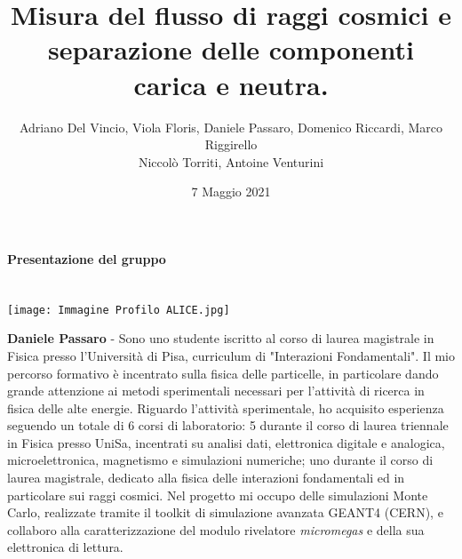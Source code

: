 \documentclass{article}
\title{\textbf{Misura del flusso di raggi cosmici e separazione delle componenti carica e neutra.}}
\author{Adriano Del Vincio, Viola Floris, Daniele Passaro, Domenico Riccardi, Marco Riggirello
\\
Niccolò Torriti, Antoine Venturini}
\date{7 Maggio 2021}
\begin{document}
\maketitle
\begin{center}
\textbf{\Large Presentazione del gruppo}
\end{center}

\section*{}

\begin{minipage}{0.2\textwidth}
\texttt{[image: Immagine Profilo ALICE.jpg]}
\end{minipage}
\hfill
\begin{minipage}{0.75\textwidth}
\textbf{Daniele Passaro} - Sono uno studente iscritto al corso di laurea magistrale in Fisica presso l'Università di Pisa, curriculum di  "Interazioni Fondamentali". 
Il mio percorso formativo è incentrato sulla fisica delle particelle, in particolare dando grande attenzione ai metodi sperimentali necessari per l'attività di ricerca in fisica delle alte energie. Riguardo l'attività sperimentale, ho acquisito esperienza seguendo un totale di 6 corsi di laboratorio: 5 durante il corso di laurea triennale in Fisica presso UniSa, incentrati su analisi dati, elettronica digitale e analogica, microelettronica, magnetismo e simulazioni numeriche; uno durante il corso di laurea magistrale, dedicato alla fisica delle interazioni fondamentali ed in particolare sui raggi cosmici.
Nel progetto mi occupo delle simulazioni Monte Carlo, realizzate tramite il toolkit di simulazione avanzata GEANT4 (\textcopyright CERN), e collaboro alla caratterizzazione del modulo rivelatore \emph{micromegas} e della sua elettronica di lettura. 
\end{minipage}
\end{document}
